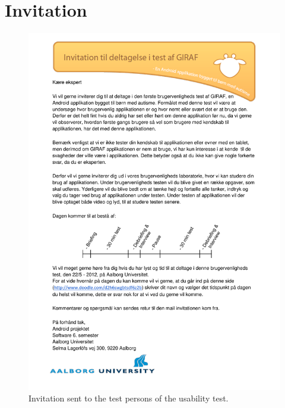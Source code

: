 \section*{Invitation}

\begin{figure}[H]
	\begin{center}
	\includegraphics[scale=0.52]{input/appendices/invitationToUsability.pdf}
	\end{center}
\caption{Invitation sent to the test persons of the usability test.}%
\label{appendice:usabilitytest}%
\end{figure}

